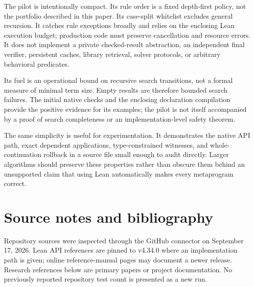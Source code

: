 \documentclass[11pt,a4paper]{article}
\theoremstyle{remark}
\begin{document}
The pilot is intentionally compact. Its rule order is a fixed depth-first policy, not the portfolio described in this paper. Its case-split whitelist excludes general recursion. It catches rule exceptions broadly and relies on the enclosing Lean execution budget; production code must preserve cancellation and resource errors. It does not implement a private checked-result abstraction, an independent final verifier, persistent caches, library retrieval, solver protocols, or arbitrary behavioral predicates.

Its fuel is an operational bound on recursive search transitions, not a formal measure of minimal term size. Empty results are therefore bounded search failures. The initial native checks and the enclosing declaration compilation provide the positive evidence for its examples; the pilot is not itself accompanied by a proof of search completeness or an implementation-level safety theorem.

The same simplicity is useful for experimentation. It demonstrates the native API path, exact dependent applications, type-constrained witnesses, and whole-continuation rollback in a source file small enough to audit directly. Larger algorithms should preserve these properties rather than obscure them behind an unsupported claim that using Lean automatically makes every metaprogram correct.

\section{Source notes and bibliography}\label{app:sources}

Repository sources were inspected through the GitHub connector on September 17, 2026. Lean API references are pinned to v4.34.0 where an implementation path is given; online reference-manual pages may document a newer release. Research references below are primary papers or project documentation. No previously reported repository test count is presented as a new run.
\end{document}
